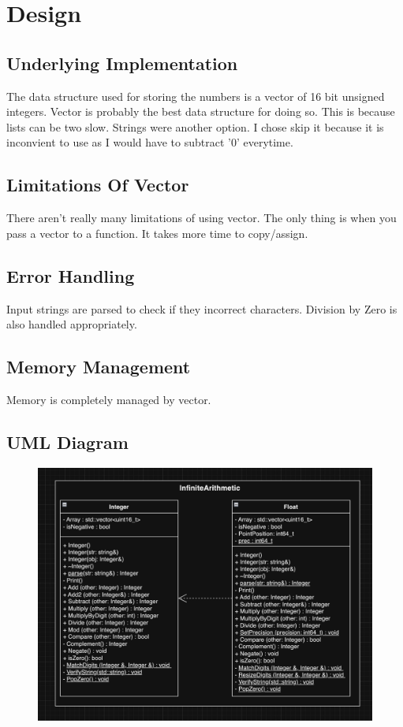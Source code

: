 \section{Design}

\subsection{Underlying Implementation}
\par 
The data structure used for storing the numbers is a vector of 16 bit unsigned integers. Vector is probably the best data structure for doing so. This is because lists can be two slow. Strings were another option. I chose skip it because it is inconvient to use as I would have to subtract '0' everytime.

\subsection{Limitations Of Vector}
\par
There aren't really many limitations of using vector. The only thing is when you pass a vector to a function. It takes more time to copy/assign.

\subsection{Error Handling}
\par
Input strings are parsed to check if they incorrect characters. Division by Zero is also handled appropriately.

\subsection{Memory Management}
\par 
Memory is completely managed by vector.

\subsection{UML Diagram}
\begin{figure}[h]
	\centering	
	\includegraphics[scale=0.27]{UML Diagram.png}
\end{figure}

